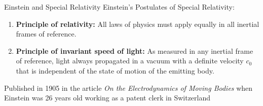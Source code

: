 \documentclass[12pt,aspectratio=169]{beamer}
\begin{document}
\begin{frame}{Einstein and Special Relativity}
  Einstein's Postulates of Special Relativity:
  \begin{enumerate}
  \item\textbf{Principle of relativity:} All laws of physics must apply equally
    in all inertial frames of reference.
  \item\textbf{Principle of invariant speed of light:} As measured in any
    inertial frame of reference, light always propagated in a vacuum with a
    definite velocity $c_0$ that is independent of the state of motion of the
    emitting body.
  \end{enumerate}
  Published in 1905 in the article \emph{On the Electrodynamics of Moving
    Bodies} when Einstein was 26 years old working as a patent clerk in
  Switzerland
\end{frame}
\end{document}
